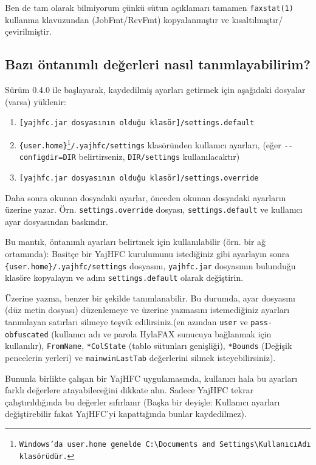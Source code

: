 \documentclass[a4paper,10pt]{scrartcl}
\begin{document}
Ben de tam olarak bilmiyorum çünkü sütun açıklamarı 
tamamen \verb.faxstat(1). kullanma klavuzundan (JobFmt/RcvFmt) kopyalanmıştır
ve kısaltılmıştır/çevirilmiştir. 

\subsection{Bazı öntanımlı değerleri nasıl tanımlayabilirim?}

Sürüm 0.4.0 ile başlayarak, kaydedilmiş ayarları getirmek için aşağıdaki dosyalar (varsa) yüklenir:
\begin{enumerate}
 \item \texttt{[yajhfc.jar dosyasının olduğu klasör]/settings.default}
 \item \texttt{\{user.home\}\footnote{Windows'da \texttt{user.home} genelde \texttt{C:\textbackslash Documents and Settings\textbackslash KullanıcıAdı klasörüdür}.}/.yajhfc/settings} klasöründen kullanıcı ayarları, (eğer \texttt{-{-}configdir=DIR} belirtirseniz, \texttt{DIR/settings} kullanılacaktır)
 \item \texttt{[yajhfc.jar dosyasının olduğu klasör]/settings.override}
\end{enumerate}

Daha sonra okunan dosyadaki ayarlar, önceden okunan dosyadaki ayarların üzerine yazar. Örn. \texttt{settings.override} dosyası, \texttt{settings.default} ve kullanıcı ayar dosyasından baskındır.
\medskip

Bu mantık, öntanımlı ayarları belirtmek için kullanılabilir (örn. bir ağ ortamında):
Basitçe bir YajHFC kurulumunu istediğiniz gibi ayarlayın sonra \texttt{\{user.home\}/.yajhfc/settings} dosyasını, \texttt{yajhfc.jar} dosyasının bulunduğu klasöre kopyalayın ve adını \texttt{settings.default} olarak değiştirin.
\medskip

Üzerine yazma, benzer bir şekilde tanımlanabilir. Bu durumda, ayar dosyasını (düz metin dosyası) düzenlemeye ve üzerine yazmasını istemediğiniz ayarları tanımlayan satırları silmeye teşvik edilirsiniz.(en azından \texttt{user} ve \texttt{pass-obfuscated} (kullanıcı adı ve parola HylaFAX sunucuya bağlanmak için kullanılır), \texttt{FromName}, \texttt{*ColState} (tablo sütunları genişliği), \texttt{*Bounds} (Değişik pencelerin yerleri) ve \texttt{mainwinLastTab} değerlerini silmek isteyebilirsiniz).

Bununla birlikte çalışan bir YajHFC uygulamasında, kullanıcı hala bu ayarları farklı değerlere atayabileceğini dikkate alın.
Sadece YajHFC tekrar çalıştırıldığında bu değerler sıfırlanır (Başka bir deyişle: Kullanıcı ayarları değiştirebilir fakat YajHFC'yi kapattığında bunlar kaydedilmez).
\end{document}
